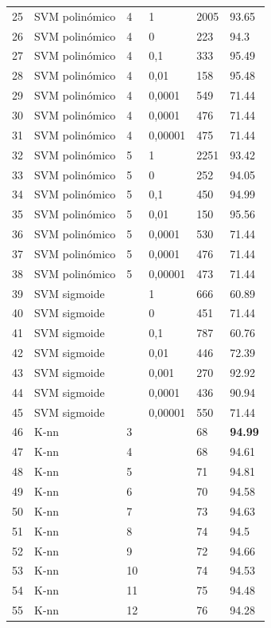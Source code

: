 \documentclass[journal]{IEEEtran}
\begin{document}
\begin{table}[!hb]
\begin{tabular}{l | l l l | l l}
	25	&	SVM polinómico 	&	4	&	1	&	2005	&	93.65 \\
	26	&	SVM polinómico 	&	4	&	0	&	223	&	94.3 \\
	27	&	SVM polinómico 	&	4	&	 0,1  	&	333	&	95.49 \\
	28	&	SVM polinómico 	&	4	&	 0,01  	&	158	&	95.48 \\
	29	&	SVM polinómico 	&	4	&	0,0001	&	549	&	71.44 \\
	30	&	SVM polinómico 	&	4	&	 0,0001  	&	476	&	71.44 \\
	31	&	SVM polinómico 	&	4	&	 0,00001  	&	475	&	71.44 \\
	32	&	SVM polinómico 	&	5	&	1	&	2251	&	93.42 \\
	33	&	SVM polinómico 	&	5	&	0	&	252	&	94.05 \\
	34	&	SVM polinómico 	&	5	&	 0,1  	&	450	&	94.99 \\
	35	&	SVM polinómico 	&	5	&	 0,01  	&	150	&	95.56 \\
	36	&	SVM polinómico 	&	5	&	0,0001	&	530	&	71.44 \\
	37	&	SVM polinómico 	&	5	&	 0,0001  	&	476	&	71.44 \\
	38	&	SVM polinómico 	&	5	&	 0,00001  	&	473	&	71.44 \\
	39	&	SVM sigmoide 	&		&	1	&	666	&	60.89 \\
	40	&	SVM sigmoide 	&		&	0	&	451	&	71.44 \\
	41	&	SVM sigmoide 	&		&	 0,1 	&	787	&	60.76 \\
	42	&	SVM sigmoide 	&		&	 0,01 	&	446	&	72.39 \\
	43	&	SVM sigmoide 	&		&	0,001	&	270	&	92.92 \\
	44	&	SVM sigmoide 	&		&	 0,0001 	&	436	&	90.94 \\
	45	&	SVM sigmoide 	&		&	 0,00001 	&	550	&	71.44 \\
\hline
	46	&	K-nn	&	3	&		&	68	&	\textbf{94.99} \\
	47	&	K-nn	&	4	&		&	68	&	94.61 \\
	48	&	K-nn	&	5	&		&	71	&	94.81 \\
	49	&	K-nn	&	6	&		&	70	&	94.58 \\
	50	&	K-nn	&	7	&		&	73	&	94.63 \\
	51	&	K-nn	&	8	&		&	74	&	94.5 \\
	52	&	K-nn	&	9	&		&	72	&	94.66 \\
	53	&	K-nn	&	10	&		&	74	&	94.53 \\
	54	&	K-nn	&	11	&		&	75	&	94.48 \\
	55	&	K-nn	&	12	&		&	76	&	94.28 \\

\end{tabular}
\end{table}
\end{document}
